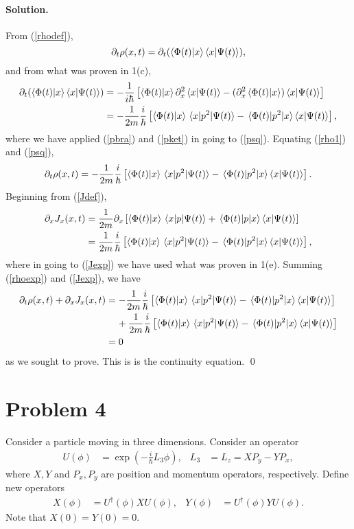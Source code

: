 \documentclass[10pt]{article}
\newcommand{\refeq}[1]{(\ref{#1})}
\newenvironment{statement}
{
    \color{darkgray}
    \ignorespaces
}
{
}
\newenvironment{solution}
{
    \paragraph{Solution.}
    \ignorespaces
}
{
    \bigskip
}
\begin{document}
\begin{solution}
	From \refeq{rhodef},
	\begin{equation} \label{rho1}
		\partial_t \rho(x, t) = \partial_t (\braket{\Phi(t)}{x} \braket{x}{\Psi(t)}),
	\end{equation}
	and from what was proven in 1(c),
	\begin{align} 
		\partial_t ( \braket{\Phi(t)}{x} \braket{x}{\Psi(t)}) &= -\frac{1}{i \hbar} \left[ \braket{\Phi(t)}{x} \partial_x^2 \braket{x}{\Psi(t)} - (\partial_x^2 \braket{\Phi(t)}{x}) \braket{x}{\Psi(t)} \right] \\
		&= -\frac{1}{2m} \frac{i}{\hbar} \left[ \braket{\Phi(t)}{x} \mel{x}{p^2}{\Psi(t)} - \mel{\Phi(t)}{p^2}{x} \braket{x}{\Psi(t)} \right], \label{psq}
	\end{align}
	where we have applied \refeq{pbra} and \refeq{pket} in going to \refeq{psq}.  Equating \refeq{rho1} and \refeq{psq},
	\begin{equation} \label{rhoexp}
		\partial_t \rho(x, t) = -\frac{1}{2m} \frac{i}{\hbar} \left[ \braket{\Phi(t)}{x} \mel{x}{p^2}{\Psi(t)} - \mel{\Phi(t)}{p^2}{x} \braket{x}{\Psi(t)} \right].
	\end{equation}
	Beginning from \refeq{Jdef},
	\begin{align}
		\partial_x J_x(x, t) &= \frac{1}{2m} \partial_x \left[ \braket{\Phi(t)}{x} \mel{x}{p}{\Psi(t)} + \mel{\Phi(t)}{p}{x} \braket{x}{\Psi(t)} \right] \\
		&= \frac{1}{2m} \frac{i}{\hbar} \left[ \braket{\Phi(t)}{x} \mel{x}{p^2}{\Psi(t)} - \mel{\Phi(t)}{p^2}{x} \braket{x}{\Psi(t)} \right] \label{Jexp},
	\end{align}
	where in going to \refeq{Jexp} we have used what was proven in 1(e).  Summing \refeq{rhoexp} and \refeq{Jexp}, we have
	\begin{align}
		\partial_t \rho(x, t) + \partial_x J_x(x, t) &= -\frac{1}{2m} \frac{i}{\hbar} \left[ \braket{\Phi(t)}{x} \mel{x}{p^2}{\Psi(t)} - \mel{\Phi(t)}{p^2}{x} \braket{x}{\Psi(t)} \right] \notag \\
		&\phantom{=\ } + \frac{1}{2m} \frac{i}{\hbar} \left[ \braket{\Phi(t)}{x} \mel{x}{p^2}{\Psi(t)} - \mel{\Phi(t)}{p^2}{x} \braket{x}{\Psi(t)} \right] \\
		&= 0
	\end{align}
	as we sought to prove.  This is is the continuity equation. \qed
\end{solution}

\newcommand{\Le}{L_3}
\newcommand{\Lz}{L_z}
\newcommand{\Py}{P_y}
\newcommand{\Px}{P_x}

\newcommand{\Ud}{U^\dagger}

\section{Problem 4}
\begin{statement}
	Consider a particle moving in three dimensions.  Consider an operator
	\begin{align} \label{defu}
		U(\phi) &= \exp(-\frac{i}{\hbar} \Le \phi), & \Le &= \Lz = X \Py - Y \Px,
	\end{align}
	where $X, Y$ and $\Px, \Py$ are position and momentum operators, respectively.  Define new operators
	\begin{align} \label{defxy}
		X(\phi) &= \Ud(\phi) X U(\phi), &
		Y(\phi) &= \Ud(\phi) Y U(\phi).
	\end{align}
	Note that $X(0) = Y(0) = 0$.
\end{statement}
\end{document}
